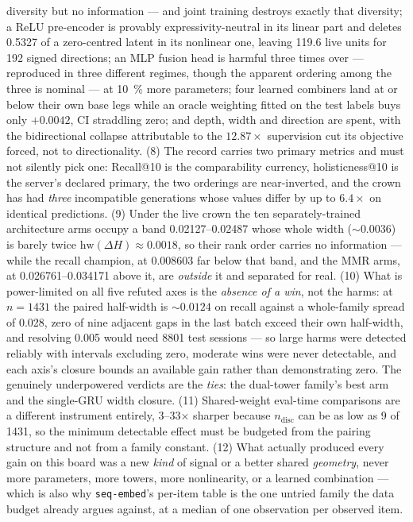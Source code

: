 \documentclass[11pt]{article}
\begin{document}
diversity but no information --- and joint training destroys exactly that
diversity; a ReLU pre-encoder is provably expressivity-neutral in its linear part
and deletes \num{0.5327} of a zero-centred latent in its nonlinear one, leaving
\num{119.6} live units for \num{192} signed directions; an MLP fusion head is
harmful three times over --- reproduced in three different regimes, though the
apparent ordering among the three is nominal --- at \SI{10}{\percent} more
parameters; four learned combiners land at
or below their own base legs while an oracle weighting fitted on the test labels
buys only $+\num{0.0042}$, CI straddling zero; and depth, width and direction are
spent, with the bidirectional collapse attributable to the
$12.87\times$ supervision cut its objective forced, not to directionality. (8)
The record carries two primary metrics and must not silently pick one: Recall@10
is the comparability currency, holisticness@10 is the server's declared primary,
the two orderings are near-inverted, and the crown has had \emph{three}
incompatible generations whose values differ by up to $6.4\times$ on identical
predictions. (9) Under the live crown the ten separately-trained architecture arms occupy a
band \numrange{0.02127}{0.02487} whose whole width (${\sim}\num{0.0036}$) is
barely twice $\mathrm{hw}(\Delta H)\approx\num{0.0018}$, so their rank order
carries no information --- while the recall champion, at \num{0.008603} far below
that band, and the MMR arms, at \numrange{0.026761}{0.034171} above it, are
\emph{outside} it and separated for real. (10) What is power-limited on all five refuted axes is the
\emph{absence of a win}, not the harms: at $n=\num{1431}$ the paired half-width is
${\sim}\num{0.0124}$ on recall against a whole-family spread of \num{0.028}, zero
of nine adjacent gaps in the last batch exceed their own half-width, and resolving
\num{0.005} would need \num{8801} test sessions --- so large harms were detected
reliably with intervals excluding zero, moderate wins were never detectable, and
each axis's closure bounds an available gain rather than demonstrating zero. The
genuinely underpowered verdicts are the \emph{ties}: the dual-tower family's best
arm and the single-GRU width closure. (11) Shared-weight eval-time comparisons are a different
instrument entirely, \numrange{3}{33}$\times$ sharper because $n_{\text{disc}}$
can be as low as \num{9} of \num{1431}, so the minimum detectable effect must be
budgeted from the pairing structure and not from a family constant. (12) What
actually produced every gain on this board was a new \emph{kind} of signal or a
better shared \emph{geometry}, never more parameters, more towers, more
nonlinearity, or a learned combination --- which is also why
\texttt{seq-embed}'s per-item table is the one untried family the data budget
already argues against, at a median of one observation per observed item.
\end{document}
